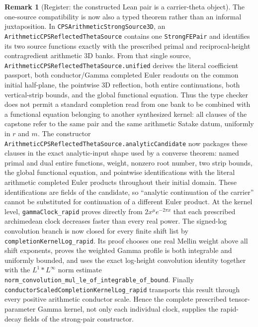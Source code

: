 \documentclass[11pt]{article}
\theoremstyle{definition}
\newtheorem{remark}[theorem]{Remark}
\begin{document}
\begin{remark}[Register: the constructed Lean pair is a carrier-theta object]
The one-source compatibility is now also a typed theorem rather than an informal juxtaposition.
In \texttt{CPSArithmeticStrongSource3D}, an
\texttt{ArithmeticCPSReflectedThetaSource} contains one \texttt{StrongFEPair} and identifies
its two source functions exactly with the prescribed primal and reciprocal-height contragredient
arithmetic 3D banks.  From that single source,
\texttt{ArithmeticCPSReflectedThetaSource.unified} derives the literal coefficient passport,
both conductor/Gamma completed Euler readouts on the common initial half-plane, the pointwise 3D
reflection, both entire continuations, both vertical-strip bounds, and the global functional
equation.  Thus the type checker does not permit a standard completion read from one bank to be
combined with a functional equation belonging to another synthesized kernel: all clauses of the
capstone refer to the same pair and the same arithmetic Satake datum, uniformly in $r$ and $m$.
The constructor \texttt{ArithmeticCPSReflectedThetaSource.analyticCandidate} now packages these
clauses in the exact analytic-input shape used by a converse theorem: named primal and dual entire
functions, weight, nonzero root number, two strip bounds, the global functional equation, and
pointwise identifications with the literal arithmetic completed Euler products throughout their
initial domain.  These identifications are fields of the candidate, so ``analytic continuation of
the carrier'' cannot be substituted for continuation of a different Euler product.  At the kernel
level, \texttt{gammaClock\_rapid} proves directly from
$2x^\mu e^{-2\pi x}$ that each prescribed archimedean clock decreases faster than every real
power.  The signed-log convolution branch is now closed for every finite shift list by
\texttt{completionKernelLog\_rapid}.  Its proof chooses one real Mellin weight above all shift
exponents, proves the weighted Gamma profile is both integrable and uniformly bounded, and uses
the exact log-height convolution identity together with the $L^1*L^\infty$ norm estimate
\texttt{norm\_convolution\_mul\_le\_of\_integrable\_of\_bound}.  Finally
\texttt{conductorScaledCompletionKernelLog\_rapid} transports this result through every positive
arithmetic conductor scale.  Hence the complete prescribed tensor-parameter Gamma kernel, not
only each individual clock, supplies the rapid-decay fields of the strong-pair constructor.


\end{remark}
\end{document}
